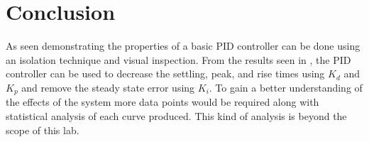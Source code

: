 \documentclass[main.tex]{subfile}
\begin{document}
\section{Conclusion} 
\label{sec:conclusion}

As seen demonstrating the properties of a basic PID controller can be done using
an isolation technique and visual inspection. From the results seen in
, the PID controller can be used to decrease the settling,
peak, and rise times using $K_d$ and $K_p$ and remove the steady state error
using $K_i$. To gain a better understanding of the effects of the system more
data points would be required along with statistical analysis of each curve
produced. This kind of analysis is beyond the scope of this lab.

\end{document}
